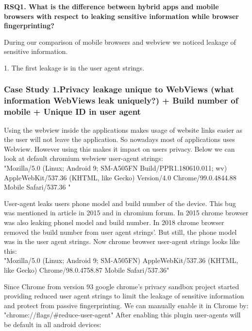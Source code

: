  \textbf{RSQ1. What is the difference between hybrid apps and mobile browsers with respect to leaking sensitive information while browser fingerprinting?} \par
During our comparison of mobile browsers and webview we noticed leakage of sensitive information. \par
1. The first leakage is in the user agent strings.  
\subsubsection{Case Study 1.Privacy leakage unique to WebViews (what information WebViews leak uniquely?) + Build number of mobile + Unique ID in user agent}
\par

 Using the webview inside the applications makes usage of website links easier as the user will not leave the application. So nowadays most of applications uses  Webview. However using this makes it impact on users privacy. Below we can look at default chromium webview user-agent strings:\\
 
         "Mozilla/5.0 (Linux; Android 9; SM-A505FN Build/PPR1.180610.011; wv)                     AppleWebKit/537.36 (KHTML, like Gecko) Version/4.0  Chrome/99.0.4844.88              Mobile Safari/537.36 "         \\
         \par

User-agent leaks users phone model and build number of the device. This bug was mentioned in article in 2015\cite{nightwatch} and in chromium forum\cite{forum}. In 2015 chrome browser was also leaking phonel model and build number. In 2018 chrome browser removed the build number from user agent strings'\cite{nightwatch1}. But still, the phone model was in the user agent strings. Now chrome browser user-agent strings looks like this:\\

                "{Mozilla/5.0 (Linux; Android 9; SM-A505FN) AppleWebKit/537.36 (KHTML,                like Gecko) Chrome/98.0.4758.87 Mobile Safari/537.36}" \\
\par
 Since Chrome from version 93 google chrome's privacy sandbox project started providing reduced user agent strings to limit the leakage of sensitive information and protect from passive fingerprinting. We can manually enable it in Chrome by: "{chrome://flags/\#reduce-user-agent}"
After enabling this plugin user-agents will be default in all android devices:\\

